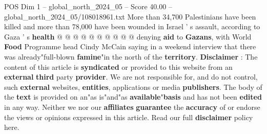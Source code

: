 \begin{textsample}{POS Dim 1 – global\_north\_2024\_05 – Score 40.00 – global\_north\_2024\_05/108018961.txt}
More than 34,700 Palestinians have been killed and more than 78,000 have been wounded in Israel ' s assault, according to Gaza ' s \textbf{health} @ @ @ @ @ @ @ @ @ @ denying \textbf{aid} to \textbf{Gazans}, with World \textbf{Food} Programme head Cindy McCain saying in a weekend interview that there was already"full-blown \textbf{famine}"in the north of the \textbf{territory}. \textbf{Disclaimer} : The content of this article is \textbf{syndicated} or provided to this website from an \textbf{external} \textbf{third} party \textbf{provider}.
We are not responsible for, and do not control, such \textbf{external} websites, \textbf{entities}, applications or media \textbf{publishers}.
The body of the \textbf{text} is provided on an"as is"and"as \textbf{available}"\textbf{basis} and has not been \textbf{edited} in any way.
Neither we nor our \textbf{affiliates} \textbf{guarantee} the \textbf{accuracy} of or endorse the views or opinions expressed in this article.
Read our full \textbf{disclaimer} policy here.

\end{textsample}
